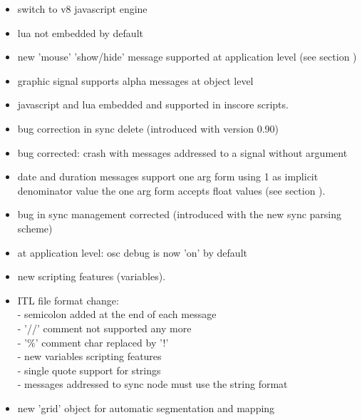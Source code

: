 \begin{itemize}
\item switch to v8 javascript engine
\item lua not embedded by default
\end{itemize}

\begin{itemize}
\item new 'mouse' 'show/hide' message supported at application level (see section )
\item graphic signal supports alpha messages at object level
\item javascript and lua embedded and supported in inscore scripts.
\item bug correction in sync delete (introduced with version 0.90)
\end{itemize}

\begin{itemize}
\item bug corrected: crash with messages addressed to a signal without argument
\item date and duration messages support one arg form using 1 as implicit denominator value 
  the one arg form accepts float values  (see section ).
\end{itemize}

\begin{itemize}
\item bug in sync management corrected (introduced with the new sync parsing scheme)
\end{itemize}

\begin{itemize}
\item at application level: osc debug is now 'on' by default
\item new scripting features (variables).
\item ITL file format change: \\
  - semicolon added at the end of each message \\
  - '//' comment not supported any more \\
  - '\%' comment char replaced by '!' \\
  - new variables scripting features \\
  - single quote support for strings \\
  - messages addressed to sync node must use the string format
\item new 'grid' object for automatic segmentation and mapping
\end{itemize}

